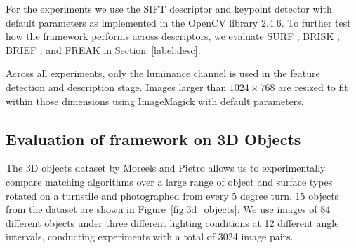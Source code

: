 \documentclass[review]{elsarticle}
\begin{document}
For the experiments we use the SIFT descriptor and keypoint detector with default parameters as implemented in the OpenCV library 2.4.6.  To further test how the framework performs across descriptors, we evaluate SURF \cite{bay2006surf}, BRISK \cite{leutenegger2011brisk}, BRIEF \cite{calonder2010brief}, and FREAK \cite{alahi2012freak} in Section~\ref{label:desc}. 

Across all experiments, only the luminance channel is used in the feature detection and description stage.  Images larger than $1024\!\times\!768$ are resized to fit within those dimensions using ImageMagick with default parameters.  

\subsection{Evaluation of framework on 3D Objects}
\label{S:3dobjects}

The 3D objects dataset by Moreels and Pietro \cite{moreels2007evaluation} allows us to experimentally compare matching algorithms over a large range of object and surface types rotated on a turnstile and photographed from every 5 degree turn.  15 objects from the dataset are shown in Figure~\ref{fig:3d_objects}.  We use images of 84 different objects under three different lighting conditions at 12 different angle intervals, conducting experiments with a total of 3024 image pairs.  
\end{document}
